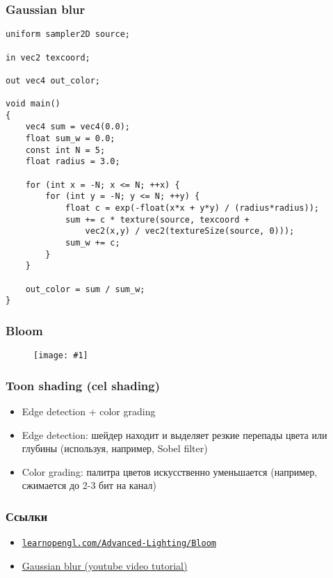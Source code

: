 \documentclass{beamer}
\newcommand{\slideimage}[1]{
  \begin{figure}
    \begin{adjustbox}{width=\textwidth, totalheight=\textheight-2\baselineskip-2\baselineskip,keepaspectratio}
      \texttt{[image: \#1]}
    \end{adjustbox}
  \end{figure}
}
\begin{document}
\begin{frame}[fragile]
\frametitle{Gaussian blur}
\fontsize{10pt}{10pt}
\begin{verbatim}
uniform sampler2D source;

in vec2 texcoord;

out vec4 out_color;

void main()
{
    vec4 sum = vec4(0.0);
    float sum_w = 0.0;
    const int N = 5;
    float radius = 3.0;

    for (int x = -N; x <= N; ++x) {
        for (int y = -N; y <= N; ++y) {
            float c = exp(-float(x*x + y*y) / (radius*radius));
            sum += c * texture(source, texcoord +
                vec2(x,y) / vec2(textureSize(source, 0)));
            sum_w += c;
        }
    }

    out_color = sum / sum_w;
}
\end{verbatim}
\end{frame}

\begin{frame}[fragile]
\frametitle{Bloom}
\slideimage{bloom-diagram.png}
\end{frame}

\begin{frame}[fragile]
\frametitle{Toon shading (cel shading)}
\begin{itemize}
\item Edge detection + color grading
\pause
\item Edge detection: шейдер находит и выделяет резкие перепады цвета или глубины (используя, например, Sobel filter)
\pause
\item Color grading: палитра цветов искусственно уменьшается (например, сжимается до 2-3 бит на канал)
\end{itemize}
\end{frame}

\begin{frame}[fragile]
\frametitle{Ссылки}
\begin{itemize}
\item \href{https://learnopengl.com/Advanced-Lighting/Bloom}{\nolinkurl{learnopengl.com/Advanced-Lighting/Bloom}}
\item \href{https://www.youtube.com/watch?v=uZlwbWqQKpc}{Gaussian blur (youtube video tutorial)}
\end{itemize}
\end{frame}
\end{document}
